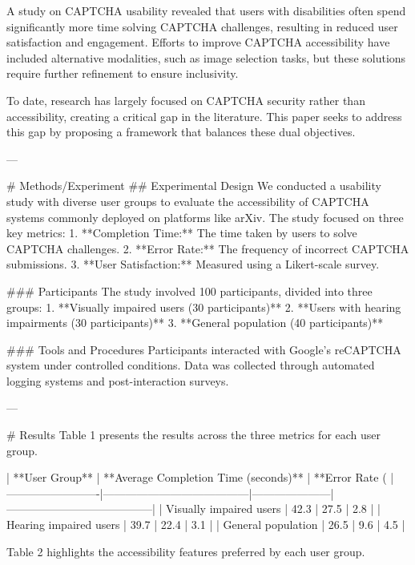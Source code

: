 A study on CAPTCHA usability revealed that users with disabilities often spend significantly more time solving CAPTCHA challenges, resulting in reduced user satisfaction and engagement. Efforts to improve CAPTCHA accessibility have included alternative modalities, such as image selection tasks, but these solutions require further refinement to ensure inclusivity.  

To date, research has largely focused on CAPTCHA security rather than accessibility, creating a critical gap in the literature. This paper seeks to address this gap by proposing a framework that balances these dual objectives.

---

# Methods/Experiment  
## Experimental Design  
We conducted a usability study with diverse user groups to evaluate the accessibility of CAPTCHA systems commonly deployed on platforms like arXiv. The study focused on three key metrics:  
1. **Completion Time:** The time taken by users to solve CAPTCHA challenges.  
2. **Error Rate:** The frequency of incorrect CAPTCHA submissions.  
3. **User Satisfaction:** Measured using a Likert-scale survey.  

### Participants  
The study involved 100 participants, divided into three groups:  
1. **Visually impaired users (30 participants)**  
2. **Users with hearing impairments (30 participants)**  
3. **General population (40 participants)**  

### Tools and Procedures  
Participants interacted with Google's reCAPTCHA system under controlled conditions. Data was collected through automated logging systems and post-interaction surveys.  

---

# Results  
Table 1 presents the results across the three metrics for each user group.  

| **User Group**         | **Average Completion Time (seconds)** | **Error Rate (%
|-------------------------|---------------------------------------|---------------------|---------------------------------------|
| Visually impaired users | 42.3                                 | 27.5                | 2.8                                   |
| Hearing impaired users  | 39.7                                 | 22.4                | 3.1                                   |
| General population      | 26.5                                 | 9.6                 | 4.5                                   |

Table 2 highlights the accessibility features preferred by each user group.  

